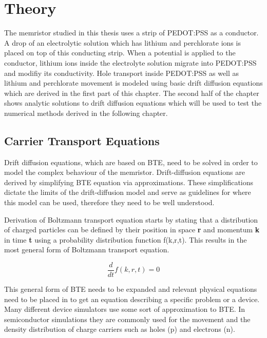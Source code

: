 
\chapter{Theory} %

\label{Chapter2} %

\begin{doublespace}
The memristor studied in this thesis uses a strip of PEDOT:PSS as a conductor. A drop of an electrolytic solution which has lithium and perchlorate ions is placed on top of this conducting strip. When a potential is applied to the conductor, lithium ions inside the electrolyte solution migrate into PEDOT:PSS and modifiy its conductivity. Hole transport inside PEDOT:PSS as well as lithium and perchlorate movement is modeled using basic drift diffusion equations which are derived in the first part of this chapter. The second half of the chapter shows analytic solutions to drift diffusion equations which will be used to test the numerical methods derived in the following chapter.


\section{Carrier Transport Equations}
Drift diffusion equations, which are based on BTE\cite{Dragica1}, need to be solved in order to model the complex behaviour of the memristor. Drift-diffusion equations are derived by simplifying BTE equation via approximations. These simplifications dictate the limits of the drift-diffusion model and serve as guidelines for where this model can be used, therefore they need to be well understood.

Derivation of Boltzmann transport equation starts by stating that a distribution of charged particles can be defined by their position in space \textbf{r} and momentum \textbf{k} in time \textbf{t} using a probability distribution function f(k,r,t). This results in the most general form of Boltzmann transport equation.

\begin{equation}
\frac{d }{dt}f(k,r,t)=0
\end{equation}

This general form of BTE needs to be expanded and relevant physical equations need to be placed in to get an equation describing a specific problem or a device. 
Many different device simulators use some sort of approximation to BTE. In semiconductor simulations they are commonly used for the movement and the density distribution of charge carriers such as holes (p) and electrons (n). 


\end{doublespace}
